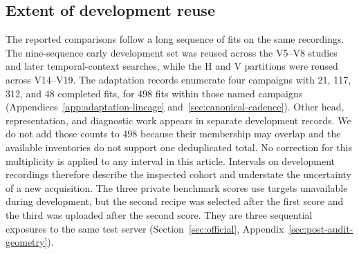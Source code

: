 \subsection{Extent of development reuse}
The reported comparisons follow a long sequence of fits on the same recordings. The nine-sequence early development set was reused across the V5--V8 studies and later temporal-context searches, while the H and V partitions were reused across V14--V19. The adaptation records enumerate four campaigns with 21, 117, 312, and 48 completed fits, for 498 fits within those named campaigns (Appendices~\ref{app:adaptation-lineage} and~\ref{sec:canonical-cadence}). Other head, representation, and diagnostic work appears in separate development records. We do not add those counts to 498 because their membership may overlap and the available inventories do not support one deduplicated total. No correction for this multiplicity is applied to any interval in this article. Intervals on development recordings therefore describe the inspected cohort and understate the uncertainty of a new acquisition. The three private benchmark scores use targets unavailable during development, but the second recipe was selected after the first score and the third was uploaded after the second score. They are three sequential exposures to the same test server (Section~\ref{sec:official}, Appendix~\ref{sec:post-audit-geometry}).
\FloatBarrier
